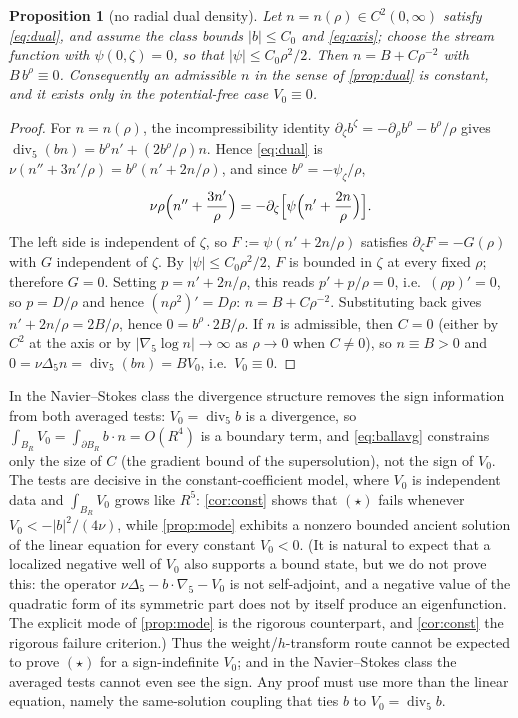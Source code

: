 \documentclass[11pt]{article}
\newtheorem{proposition}[theorem]{Proposition}
\theoremstyle{definition}
\newcommand{\Div}{\operatorname{div}}
\begin{document}
\begin{proposition}[no radial dual density]\label{prop:radial}
Let $n=n(\rho)\in C^2(0,\infty)$ satisfy \eqref{eq:dual}, and assume the class
bounds $|b|\le C_0$ and \eqref{eq:axis}; choose the stream function with
$\psi(0,\zeta)=0$, so that $|\psi|\le C_0\rho^2/2$.
Then $n=B+C\rho^{-2}$ with $B\,b^\rho\equiv0$. Consequently an admissible $n$
in the sense of \cref{prop:dual} is constant, and it exists only in the
potential-free case $V_0\equiv0$.
\end{proposition}
\begin{proof}
For $n=n(\rho)$, the incompressibility identity
$\partial_\zeta b^\zeta=-\partial_\rho b^\rho-b^\rho/\rho$ gives
$\Div_5(bn)=b^\rho n'+(2b^\rho/\rho)n$. Hence \eqref{eq:dual} is
$\nu(n''+3n'/\rho)=b^\rho(n'+2n/\rho)$, and since $b^\rho=-\psi_\zeta/\rho$,
\begin{equation}
\nu\rho\Bigl(n''+\frac{3n'}{\rho}\Bigr)
=-\partial_\zeta\Bigl[\psi\Bigl(n'+\frac{2n}{\rho}\Bigr)\Bigr].
\end{equation}
The left side is independent of $\zeta$, so $F:=\psi(n'+2n/\rho)$ satisfies
$\partial_\zeta F=-G(\rho)$ with $G$ independent of $\zeta$. By
$|\psi|\le C_0\rho^2/2$, $F$ is bounded in $\zeta$ at every fixed $\rho$;
therefore $G=0$. Setting $p=n'+2n/\rho$, this reads
$p'+p/\rho=0$, i.e.\ $(\rho p)'=0$, so $p=D/\rho$ and hence
$(n\rho^2)'=D\rho$: $n=B+C\rho^{-2}$. Substituting back gives
$n'+2n/\rho=2B/\rho$, hence $0=b^\rho\cdot2B/\rho$. If $n$ is admissible, then
$C=0$ (either by $C^2$ at the axis or by $|\nabla_5\log n|\to\infty$ as
$\rho\to0$ when $C\ne0$), so $n\equiv B>0$ and $0=\nu\Delta_5n=\Div_5(bn)=BV_0$,
i.e.\ $V_0\equiv0$.
\end{proof}

In the Navier--Stokes class the divergence structure removes the sign
information from both averaged tests: $V_0=\Div_5b$ is a divergence, so
$\int_{B_R}V_0=\int_{\partial B_R}b\cdot n=O(R^4)$ is a boundary term, and
\eqref{eq:ballavg} constrains only the size of $C$ (the gradient bound of the
supersolution), not the sign of $V_0$. The tests are decisive in the
constant-coefficient model, where $V_0$ is independent data and
$\int_{B_R}V_0$ grows like $R^5$: \cref{cor:const}
shows that $(\star)$ fails whenever $V_0<-|b|^2/(4\nu)$, while
\cref{prop:mode} exhibits a nonzero bounded ancient solution of the linear
equation for every constant $V_0<0$. (It is natural to expect that a localized
negative well of $V_0$ also supports a bound state, but we do not prove this:
the operator $\nu\Delta_5-b\cdot\nabla_5-V_0$ is not self-adjoint, and a
negative value of the quadratic form of its symmetric part does not by itself
produce an eigenfunction. The explicit mode of \cref{prop:mode} is the
rigorous counterpart, and \cref{cor:const} the rigorous failure criterion.)
Thus the weight/$h$-transform route cannot be expected to prove $(\star)$ for
a sign-indefinite $V_0$; and in the Navier--Stokes class the averaged tests
cannot even see the sign. Any proof must use more than the linear equation,
namely the same-solution coupling that ties $b$ to $V_0=\Div_5b$.
\end{document}

